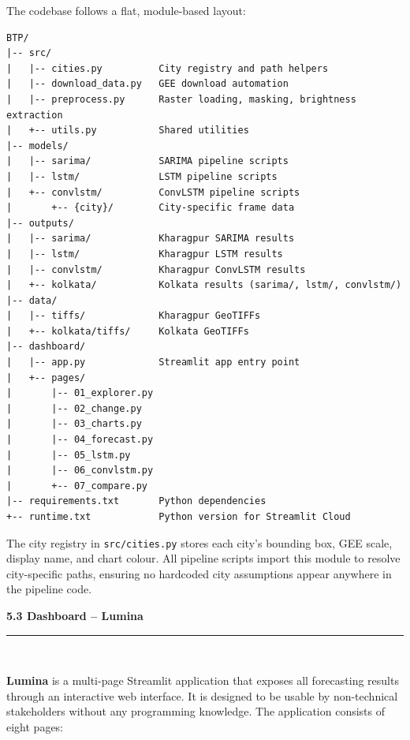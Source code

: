 \documentclass[12pt,a4paper]{report}
\begin{document}
The codebase follows a flat, module-based layout:

\begin{verbatim}
BTP/
|-- src/
|   |-- cities.py          City registry and path helpers
|   |-- download_data.py   GEE download automation
|   |-- preprocess.py      Raster loading, masking, brightness extraction
|   +-- utils.py           Shared utilities
|-- models/
|   |-- sarima/            SARIMA pipeline scripts
|   |-- lstm/              LSTM pipeline scripts
|   +-- convlstm/          ConvLSTM pipeline scripts
|       +-- {city}/        City-specific frame data
|-- outputs/
|   |-- sarima/            Kharagpur SARIMA results
|   |-- lstm/              Kharagpur LSTM results
|   |-- convlstm/          Kharagpur ConvLSTM results
|   +-- kolkata/           Kolkata results (sarima/, lstm/, convlstm/)
|-- data/
|   |-- tiffs/             Kharagpur GeoTIFFs
|   +-- kolkata/tiffs/     Kolkata GeoTIFFs
|-- dashboard/
|   |-- app.py             Streamlit app entry point
|   +-- pages/
|       |-- 01_explorer.py
|       |-- 02_change.py
|       |-- 03_charts.py
|       |-- 04_forecast.py
|       |-- 05_lstm.py
|       |-- 06_convlstm.py
|       +-- 07_compare.py
|-- requirements.txt       Python dependencies
+-- runtime.txt            Python version for Streamlit Cloud
\end{verbatim}

The city registry in \texttt{src/cities.py} stores each city's bounding box, GEE scale, display name, and chart colour. All pipeline scripts import this module to resolve city-specific paths, ensuring no hardcoded city assumptions appear anywhere in the pipeline code.

\vspace{0.5cm}
\begin{center}
    \hypertarget{sec:s53}{}%
    {\large \textbf{5.3 Dashboard -- Lumina}}\\[0.3cm]
    \noindent\rule{\linewidth}{0.4pt}\\[0.5cm]
\end{center}

\textbf{Lumina} is a multi-page Streamlit application that exposes all forecasting results through an interactive web interface. It is designed to be usable by non-technical stakeholders without any programming knowledge. The application consists of eight pages:
\end{document}
